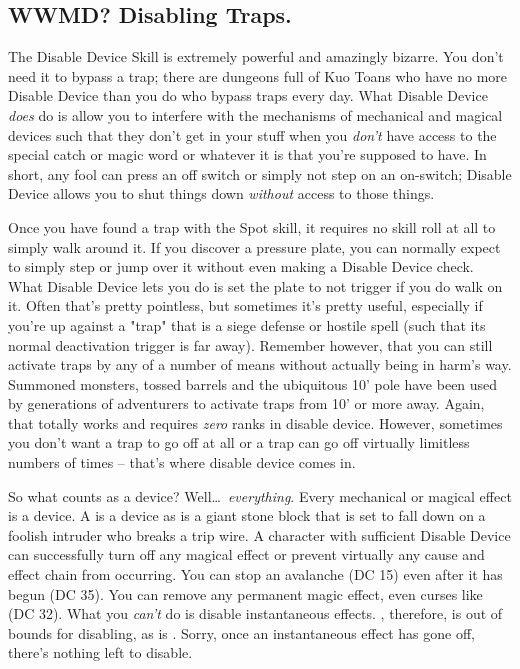 \subsection{WWMD? Disabling Traps.}
\vspace*{-8pt}

The Disable Device Skill is extremely powerful and amazingly bizarre. You don't need it to bypass a trap; there are dungeons full of Kuo Toans who have no more Disable Device than you do who bypass traps every day. What Disable Device \textit{does} do is allow you to interfere with the mechanisms of mechanical and magical devices such that they don't get in your stuff when you \textit{don't} have access to the special catch or magic word or whatever it is that you're supposed to have. In short, any fool can press an off switch or simply not step on an on-switch; Disable Device allows you to shut things down \textit{without} access to those things.

Once you have found a trap with the Spot skill, it requires no skill roll at all to simply walk around it. If you discover a pressure plate, you can normally expect to simply step or jump over it without even making a Disable Device check. What Disable Device lets you do is set the plate to not trigger if you do walk on it. Often that's pretty pointless, but sometimes it's pretty useful, especially if you're up against a "trap" that is a siege defense or hostile spell (such that its normal deactivation trigger is far away). Remember however, that you can still activate traps by any of a number of means without actually being in harm's way. Summoned monsters, tossed barrels and the ubiquitous 10' pole have been used by generations of adventurers to activate traps from 10' or more away. Again, that totally works and requires \textit{zero} ranks in disable device. However, sometimes you don't want a trap to go off at all or a trap can go off virtually limitless numbers of times -- that's where disable device comes in.

So what counts as a device? Well\ldots\ \textit{everything}. Every mechanical or magical effect is a device. A  is a device as is a giant stone block that is set to fall down on a foolish intruder who breaks a trip wire. A character with sufficient Disable Device can successfully turn off any magical effect or prevent virtually any cause and effect chain from occurring. You can stop an avalanche (DC 15) even after it has begun (DC 35). You can remove any permanent magic effect, even curses like  (DC 32). What you \textit{can't} do is disable instantaneous effects. , therefore, is out of bounds for disabling, as is . Sorry, once an instantaneous effect has gone off, there's nothing left to disable.

